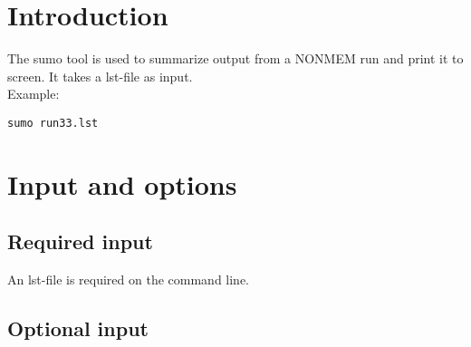 
\setlength{\evensidemargin}{0pt}
\setlength{\oddsidemargin}{0pt}




\maketitle


\section{Introduction}
The sumo tool is used to summarize output from a NONMEM run and print it to screen. It takes a lst-file as input.\\
Example:
\begin{verbatim}
sumo run33.lst
\end{verbatim}

\section{Input and options}

\subsection{Required input}
An lst-file is required on the command line.

\subsection{Optional input}

